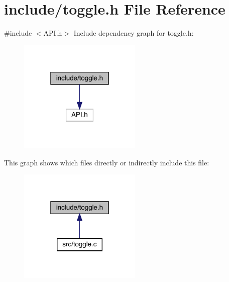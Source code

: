 \section{include/toggle.h File Reference}
\label{toggle_8h}
{\ttfamily \#include $<$A\+P\+I.\+h$>$}\newline
Include dependency graph for toggle.\+h\+:
\nopagebreak
\begin{figure}[H]
\begin{center}
\leavevmode
\includegraphics[width=166pt]{toggle_8h__incl}
\end{center}
\end{figure}
This graph shows which files directly or indirectly include this file\+:
\nopagebreak
\begin{figure}[H]
\begin{center}
\leavevmode
\includegraphics[width=166pt]{toggle_8h__dep__incl}
\end{center}
\end{figure}
